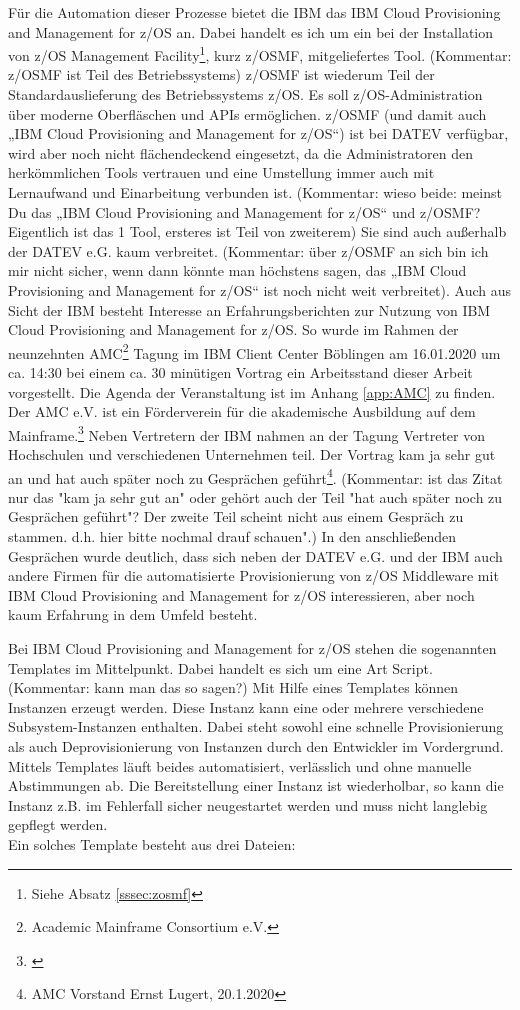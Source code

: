 Für die Automation dieser Prozesse bietet die IBM das \glqq IBM Cloud Provisioning and Management for z/OS\grqq{} an.
Dabei handelt es ich um ein bei der Installation von \glqq z/OS Management Facility\grqq{}\footnote{Siehe Absatz \ref{sssec:zosmf}}, kurz z/OSMF, mitgeliefertes Tool. (Kommentar: z/OSMF ist Teil des Betriebssystems)
z/OSMF ist wiederum Teil der Standardauslieferung des Betriebssystems z/OS.
Es soll z/OS-Administration über moderne Oberfläschen und APIs  ermöglichen.
z/OSMF (und damit auch „IBM Cloud Provisioning and Management for z/OS“) ist bei DATEV verfügbar, wird aber noch nicht flächendeckend eingesetzt, da die Administratoren den herkömmlichen Tools vertrauen und eine Umstellung immer auch mit Lernaufwand und Einarbeitung verbunden ist. (Kommentar: wieso beide: meinst Du das „IBM Cloud Provisioning and Management for z/OS“ und z/OSMF? Eigentlich ist das 1 Tool, ersteres ist Teil von zweiterem) 
Sie sind auch außerhalb der DATEV e.G. kaum verbreitet. (Kommentar: über z/OSMF an sich bin ich mir nicht sicher, wenn dann könnte man höchstens sagen, das „IBM Cloud Provisioning and Management for z/OS“ ist noch nicht weit verbreitet). 
Auch aus Sicht der IBM besteht Interesse an Erfahrungsberichten zur Nutzung von \glqq IBM Cloud Provisioning and Management for z/OS\grqq.
So wurde im Rahmen der neunzehnten \glqq AMC\grqq{}\footnote{Academic Mainframe Consortium e.V.} Tagung im IBM Client Center Böblingen am 16.01.2020 um ca. 14:30  bei einem ca. 30 minütigen Vortrag ein Arbeitsstand dieser Arbeit vorgestellt.
Die Agenda der Veranstaltung ist im Anhang \ref{app:AMC} zu finden.
Der AMC e.V. ist ein Förderverein für die akademische Ausbildung auf dem Mainframe.\footnote{\cite{Amc.23.2.2020}}
Neben Vertretern der IBM nahmen an der Tagung Vertreter von Hochschulen und verschiedenen Unternehmen teil.
Der Vortrag \glqq kam ja sehr gut an und hat auch später noch zu Gesprächen geführt\grqq\footnote{AMC Vorstand Ernst Lugert, 20.1.2020}.
(Kommentar: ist das Zitat nur das "kam ja sehr gut an" oder gehört auch der Teil "hat auch später noch zu Gesprächen geführt"? Der zweite Teil scheint nicht aus einem Gespräch zu stammen. d.h. hier bitte nochmal drauf schauen".)
In den anschließenden Gesprächen wurde deutlich, dass sich neben der DATEV e.G. und der IBM auch andere Firmen für die automatisierte Provisionierung von z/OS Middleware mit \glqq IBM Cloud Provisioning and Management for z/OS\grqq{} interessieren, aber noch kaum Erfahrung in dem Umfeld besteht.

Bei \glqq IBM Cloud Provisioning and Management for z/OS\grqq{} stehen die sogenannten \glqq Templates\grqq{} im Mittelpunkt.
Dabei handelt es sich um eine Art Script. (Kommentar: kann man das so sagen?)
Mit Hilfe eines Templates können Instanzen erzeugt werden.
Diese Instanz kann eine oder mehrere verschiedene Subsystem-Instanzen enthalten.
Dabei steht sowohl eine schnelle Provisionierung als auch Deprovisionierung von Instanzen durch den Entwickler im Vordergrund.
Mittels Templates läuft beides automatisiert, verlässlich und ohne manuelle Abstimmungen ab.
Die Bereitstellung einer Instanz ist wiederholbar, so kann die Instanz z.B. im Fehlerfall sicher neugestartet werden und muss nicht langlebig gepflegt werden.
\\ Ein solches Template besteht aus drei Dateien:

